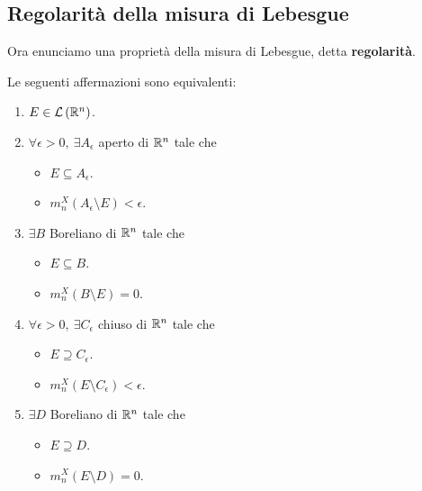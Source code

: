 \subsection{Regolarità della misura di Lebesgue}
Ora enunciamo una proprietà della misura di Lebesgue, detta \textbf{regolarità}.
\begin{theorema}\label{regolaritàlebesgue}
	Le seguenti affermazioni sono equivalenti:
	\begin{enumerate}
		\item $E\in\mathcal{L}\left(\mathbb{R}^n\right)$.
		\item $\forall \epsilon > 0,\ \exists A_{\epsilon}$ aperto di $\mathbb{R}^n$ tale che
		\begin{itemize}
			\item $E\subseteq A_{\epsilon}$.
			\item $m^{X}_n\left(A_{\epsilon}\setminus E\right)<\epsilon$.
		\end{itemize}
		\item $\exists B$ Boreliano di $\mathbb{R}^n$ tale che
	\begin{itemize}
		\item $E\subseteq B$.
		\item $m^{X}_n\left(B\setminus E\right)=0$.
	\end{itemize}
	\item $\forall \epsilon > 0,\ \exists C_{\epsilon}$ chiuso di $\mathbb{R}^n$ tale che
	\begin{itemize}
		\item $E\supseteq C_{\epsilon}$.
		\item $m^{X}_n\left(E\setminus C_{\epsilon}\right)<\epsilon$.
	\end{itemize}
	\item $\exists D$ Boreliano di $\mathbb{R}^n$ tale che
	\begin{itemize}
		\item $E\supseteq D$.
		\item $m^{X}_n\left(E\setminus D\right)=0$.
	\end{itemize}~\\
	\begin{minipage}{0.4\textwidth}
	\begin{center}

\end{center}
\end{minipage}
\end{enumerate}
\end{theorema}
